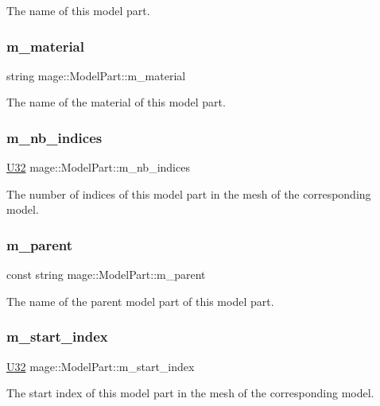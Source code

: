The name of this model part. \hypertarget{structmage_1_1_model_part_a606603dd01b895cb1aa91b51089bf27f}{}\label{structmage_1_1_model_part_a606603dd01b895cb1aa91b51089bf27f} 
\subsubsection{\texorpdfstring{m\+\_\+material}{m\_material}}
{\footnotesize\ttfamily string mage\+::\+Model\+Part\+::m\+\_\+material}

The name of the material of this model part. \hypertarget{structmage_1_1_model_part_ad4be9d829693ccb96bb45fc18aa0ede8}{}\label{structmage_1_1_model_part_ad4be9d829693ccb96bb45fc18aa0ede8} 
\subsubsection{\texorpdfstring{m\+\_\+nb\+\_\+indices}{m\_nb\_indices}}
{\footnotesize\ttfamily \hyperlink{namespacemage_a41c104c036fba3756a74e19f793eeaa1}{U32} mage\+::\+Model\+Part\+::m\+\_\+nb\+\_\+indices}

The number of indices of this model part in the mesh of the corresponding model. \hypertarget{structmage_1_1_model_part_aa76a1a4281c091050fd239eca5dd8ff6}{}\label{structmage_1_1_model_part_aa76a1a4281c091050fd239eca5dd8ff6} 
\subsubsection{\texorpdfstring{m\+\_\+parent}{m\_parent}}
{\footnotesize\ttfamily const string mage\+::\+Model\+Part\+::m\+\_\+parent}

The name of the parent model part of this model part. \hypertarget{structmage_1_1_model_part_a3151ca6c89bad26bc454aca693be97c4}{}\label{structmage_1_1_model_part_a3151ca6c89bad26bc454aca693be97c4} 
\subsubsection{\texorpdfstring{m\+\_\+start\+\_\+index}{m\_start\_index}}
{\footnotesize\ttfamily \hyperlink{namespacemage_a41c104c036fba3756a74e19f793eeaa1}{U32} mage\+::\+Model\+Part\+::m\+\_\+start\+\_\+index}

The start index of this model part in the mesh of the corresponding model. 